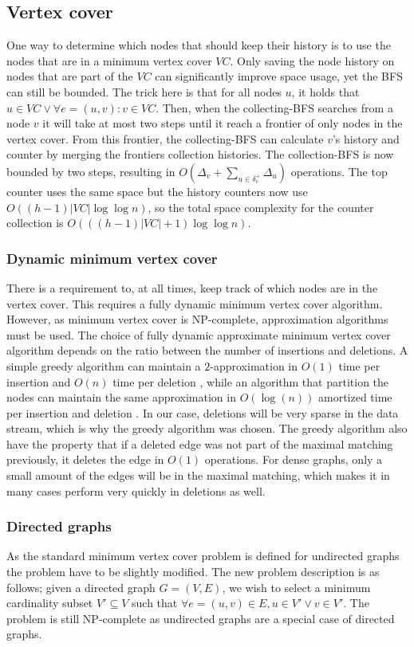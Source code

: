 \subsection{Vertex cover}
One way to determine which nodes that should keep their history is to use the nodes that are in a minimum vertex cover $VC$. Only saving the node history on nodes that are part of the $VC$ can significantly improve space usage, yet the BFS can still be bounded. The trick here is that for all nodes $u$, it holds that $u \in VC \vee \forall e = (u,v) : v \in VC$. Then, when the collecting-BFS searches from a node $v$ it will take at most two steps until it reach a frontier of only nodes in the vertex cover. From this frontier, the collecting-BFS can calculate $v$'s history and counter by merging the frontiers collection histories. The collection-BFS is now bounded by two steps, resulting in $O(\Delta_v + \sum_{u \in \delta^+_v}{\Delta_u}) $ operations. The top counter uses the same space but the history counters now use $O((h-1)|VC| \log \log n)$, so the total space complexity for the counter collection is $O(((h-1)|VC| + 1 )\log \log n)$.


\subsubsection{Dynamic minimum vertex cover}
There is a requirement to, at all times, keep track of which nodes are in the vertex cover. This requires a fully dynamic minimum vertex cover algorithm. However, as minimum vertex cover is NP-complete, approximation algorithms must be used. The choice of fully dynamic approximate minimum vertex cover algorithm depends on the ratio between the number of insertions and deletions. A simple greedy algorithm can maintain a $2$-approximation in $O(1)$ time per insertion and $O(n)$ time per deletion \cite{2appdynvc}, while an algorithm that partition the nodes can maintain the same approximation in $O(\log(n))$ amortized time per insertion and deletion \cite{2appdynvclogn}. In our case, deletions will be very sparse in the data stream, which is why the greedy algorithm was chosen. The greedy algorithm also have the property that if a deleted edge was not part of the maximal matching previously, it deletes the edge in $O(1)$ operations. For dense graphs, only a small amount of the edges will be in the maximal matching, which makes it in many cases perform very quickly in deletions as well. 

 
\subsubsection{Directed graphs}
As the standard minimum vertex cover problem is defined for undirected graphs the problem have to be slightly modified. The new problem description is as follows; given a directed graph $G = (V,E)$, we wish to select a minimum cardinality subset $V' \subseteq V$ such that $\forall e = (u,v) \in E, u \in V' \vee v \in V'$. The problem is still NP-complete as undirected graphs are a special case of directed graphs. 

